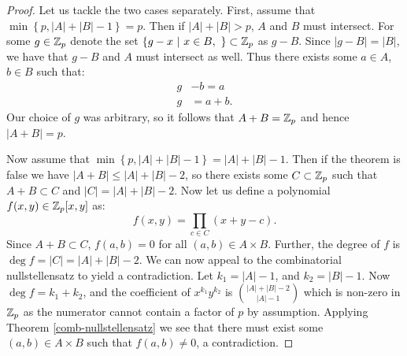 \begin{proof}
    Let us tackle the two cases separately. First, assume that $\min \left\{p, |A| + |B| -1 \right\} = p$.
    Then if $|A| + |B| > p$, $A$ and $B$ must intersect. 
    For some $g \in \mathbb Z_p$ denote the set  $\left\{ g - x  \ | \ x \in B, \  \right\} \subset \mathbb Z_p$ as $g-B$. Since $|g-B| = |B|$, we have that 
    $g-B$ and $A$ must intersect as well. Thus there exists some $a \in A$, $b \in B$ such that: 
    \begin{align*}
        g& -b = a \\
        g& = a+b.
    \end{align*}
    Our choice of $g$ was arbitrary, so it follows that $A+B = \mathbb Z_p$ and hence $|A+B| = p$.

    Now assume that $\min \left\{p, |A| + |B| -1 \right\} = |A| + |B| -1$. Then if the theorem is false we have $|A+B| \leq |A| + |B| -2$, so there exists some $C \subset \mathbb Z_p$ such that 
    $A+B \subset C$ and $|C| =  |A| + |B| -2$. Now let us define a polynomial $f(x,y) \in \mathbb Z_p [x,y]$ as:
    \[
        f(x,y) = \prod_{c \in C} (x+y -c).
    \]
    Since $A+B \subset C$, $f(a,b) =0$ for all $(a,b) \in A\times B$. Further, the degree of $f$ is $\deg f = |C| = |A| + |B| -2$. 
    We can now appeal to the combinatorial nullstellensatz to yield a contradiction. Let $k_1 = |A| -1$, and $k_2 = |B|-1$. 
    Now $\deg f = k_1 + k_2$, and the coefficient of $x^{k_1}y^{k_2}$ is
    ${|A|+|B| - 2} \choose {|A|- 1}$ which is non-zero in $\mathbb Z_p$ as the numerator cannot contain a factor of $p$ by assumption. Applying Theorem \ref{comb-nullstellensatz} we see that there 
    must exist some $(a,b) \in A \times B$ such that $f(a,b) \neq 0$, a contradiction.
\end{proof}